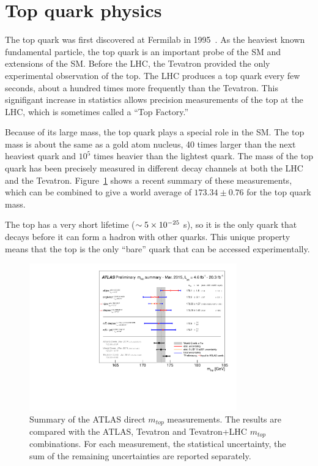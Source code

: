 \section{Top quark physics}
The top quark was first discovered at Fermilab in 1995~\cite{Abe:1995hr}\cite{Abachi:1995iq}. As the heaviest known fundamental particle, the top quark is an important probe of the SM and extensions of the SM. Before the LHC, the Tevatron provided the only experimental observation of the top. The LHC produces a top quark every few seconds, about a hundred times more frequently than the Tevatron. This signifigant increase in statistics allows precision measurements of the top at the LHC, which is sometimes called a ``Top Factory.'' 

Because of its large mass, the top quark plays a special role in the SM. The top mass is about the same as a gold atom nucleus, 40 times larger than the next heaviest quark and $10^5$ times heavier than the lightest quark. The mass of the top quark has been precisely measured in different decay channels at both the LHC and the Tevatron. Figure~\ref{fig:topmass} shows a recent summary of these measurements, which can be combined to give a world average of $173.34 \pm 0.76$ for the top quark mass.

 The top has a very short lifetime ($\sim 5 \times 10^{-25}$ s), so it is the only quark that decays before it can form a hadron with other quarks. This unique property means that the top is the only ``bare'' quark that can be accessed experimentally.



\begin{figure}[h]
\centering
\includegraphics[width=0.8\textwidth]{fig/thry/mtopSummaryAll.pdf}
\caption{Summary of the ATLAS direct $m_{top}$ measurements. The results are compared with the ATLAS, Tevatron and Tevatron+LHC $m_{top}$ combinations. For each measurement, the statistical uncertainty, the sum of the remaining uncertainties are reported separately.}
\label{fig:topmass}
\end{figure}

